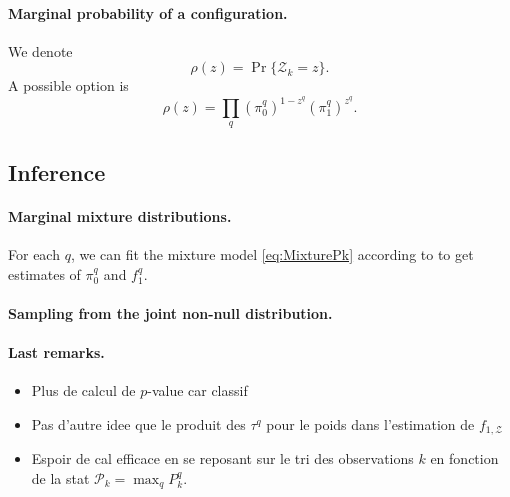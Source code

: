 \documentclass[a4paper, 11pt]{article}
\newcommand{\Pcal}{\mathcal{P}}
\newcommand{\Zcal}{\mathcal{Z}}
\begin{document}
\paragraph{Marginal probability of a configuration.} We denote
$$
\rho(z) = \Pr\{\Zcal_k = z\}.
$$
A possible option is
$$
\rho(z) = \prod_q (\pi^q_0)^{1-z^q} (\pi^q_1)^{z^q}.
$$

\subsection{Inference}

\paragraph{Marginal mixture distributions.} For each $q$, we can fit the mixture model \eqref{eq:MixturePk} according to \cite{RBD07} to get estimates of $\pi^q_0$ and $f^q_1$.

\paragraph{Sampling from the joint non-null distribution.} 


\paragraph{Last remarks.} 
\begin{itemize}
 \item Plus de calcul de $p$-value car classif
 \item Pas d'autre idee que le produit des $\tau^q$ pour le poids dans l'estimation de $f_{1, \Zcal}$
 \item Espoir de cal efficace en se reposant sur le tri des observations $k$ en fonction de la stat $\Pcal_k = \max_q P^q_k$.
\end{itemize}




\end{document}
